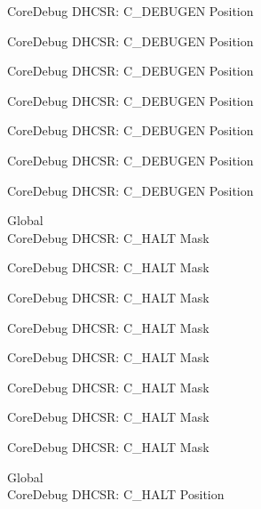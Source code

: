 \begin{DoxyRefList}
\label{deprecated__deprecated000127}%
%
Core\+Debug DHCSR\+: C\+\_\+\+DEBUGEN Position 

\label{deprecated__deprecated000183}%
%
Core\+Debug DHCSR\+: C\+\_\+\+DEBUGEN Position 

\label{deprecated__deprecated000266}%
%
Core\+Debug DHCSR\+: C\+\_\+\+DEBUGEN Position 

\label{deprecated__deprecated000325}%
%
Core\+Debug DHCSR\+: C\+\_\+\+DEBUGEN Position 

\label{deprecated__deprecated000401}%
%
Core\+Debug DHCSR\+: C\+\_\+\+DEBUGEN Position 

\label{deprecated__deprecated000490}%
%
Core\+Debug DHCSR\+: C\+\_\+\+DEBUGEN Position 

\label{deprecated__deprecated000592}%
%
Core\+Debug DHCSR\+: C\+\_\+\+DEBUGEN Position  
\item[Global \doxylink{group___c_m_s_i_s___core_debug_ga1d905a3aa594eb2e8bb78bcc4da05b3f}{Core\+Debug\+\_\+\+DHCSR\+\_\+\+C\+\_\+\+HALT\+\_\+\+Msk} ]\hfill \\
\label{deprecated__deprecated000038}%
%
Core\+Debug DHCSR\+: C\+\_\+\+HALT Mask 

\label{deprecated__deprecated000126}%
%
Core\+Debug DHCSR\+: C\+\_\+\+HALT Mask 

\label{deprecated__deprecated000182}%
%
Core\+Debug DHCSR\+: C\+\_\+\+HALT Mask 

\label{deprecated__deprecated000265}%
%
Core\+Debug DHCSR\+: C\+\_\+\+HALT Mask 

\label{deprecated__deprecated000324}%
%
Core\+Debug DHCSR\+: C\+\_\+\+HALT Mask 

\label{deprecated__deprecated000400}%
%
Core\+Debug DHCSR\+: C\+\_\+\+HALT Mask 

\label{deprecated__deprecated000489}%
%
Core\+Debug DHCSR\+: C\+\_\+\+HALT Mask 

\label{deprecated__deprecated000591}%
%
Core\+Debug DHCSR\+: C\+\_\+\+HALT Mask  
\item[Global \doxylink{group___c_m_s_i_s___core_debug_gaddf1d43f8857e4efc3dc4e6b15509692}{Core\+Debug\+\_\+\+DHCSR\+\_\+\+C\+\_\+\+HALT\+\_\+\+Pos} ]\hfill \\
\label{deprecated__deprecated000037}%
%
Core\+Debug DHCSR\+: C\+\_\+\+HALT Position 


\end{DoxyRefList}
